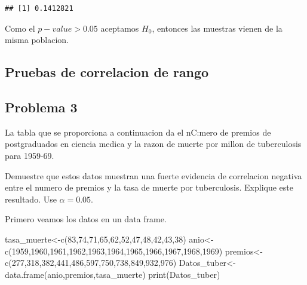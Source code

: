 \documentclass[
]{article}
\newenvironment{Shaded}{\begin{snugshade}}{\end{snugshade}}
\newcommand{\DecValTok}[1]{\textcolor[rgb]{0.00,0.00,0.81}{#1}}
\newcommand{\FunctionTok}[1]{\textcolor[rgb]{0.00,0.00,0.00}{#1}}
\newcommand{\NormalTok}[1]{#1}
\newcommand{\OtherTok}[1]{\textcolor[rgb]{0.56,0.35,0.01}{#1}}
\begin{document}
\begin{verbatim}
## [1] 0.1412821
\end{verbatim}

Como el \(p-value>0.05\) aceptamos \(H_{0}\), entonces las muestras
vienen de la misma poblacion.

\hypertarget{pruebas-de-correlacion-de-rango}{%
\subsection{Pruebas de correlacion de
rango}\label{pruebas-de-correlacion-de-rango}}

\hypertarget{problema-3-1}{%
\subsection{Problema 3}\label{problema-3-1}}

La tabla que se proporciona a continuacion da el nC:mero de premios de
postgraduados en ciencia medica y la razon de muerte por millon de
tuberculosis para 1959-69.

Demuestre que estos datos muestran una fuerte evidencia de correlacion
negativa entre el numero de premios y la tasa de muerte por
tuberculosis. Explique este resultado. Use \(\alpha=0.05\).

Primero veamos los datos en un data frame.

\begin{Shaded}
\begin{Highlighting}[]
\NormalTok{tasa\_muerte}\OtherTok{\textless{}{-}}\FunctionTok{c}\NormalTok{(}\DecValTok{83}\NormalTok{,}\DecValTok{74}\NormalTok{,}\DecValTok{71}\NormalTok{,}\DecValTok{65}\NormalTok{,}\DecValTok{62}\NormalTok{,}\DecValTok{52}\NormalTok{,}\DecValTok{47}\NormalTok{,}\DecValTok{48}\NormalTok{,}\DecValTok{42}\NormalTok{,}\DecValTok{43}\NormalTok{,}\DecValTok{38}\NormalTok{)}
\NormalTok{anio}\OtherTok{\textless{}{-}}\FunctionTok{c}\NormalTok{(}\DecValTok{1959}\NormalTok{,}\DecValTok{1960}\NormalTok{,}\DecValTok{1961}\NormalTok{,}\DecValTok{1962}\NormalTok{,}\DecValTok{1963}\NormalTok{,}\DecValTok{1964}\NormalTok{,}\DecValTok{1965}\NormalTok{,}\DecValTok{1966}\NormalTok{,}\DecValTok{1967}\NormalTok{,}\DecValTok{1968}\NormalTok{,}\DecValTok{1969}\NormalTok{) }
\NormalTok{premios}\OtherTok{\textless{}{-}}\FunctionTok{c}\NormalTok{(}\DecValTok{277}\NormalTok{,}\DecValTok{318}\NormalTok{,}\DecValTok{382}\NormalTok{,}\DecValTok{441}\NormalTok{,}\DecValTok{486}\NormalTok{,}\DecValTok{597}\NormalTok{,}\DecValTok{750}\NormalTok{,}\DecValTok{738}\NormalTok{,}\DecValTok{849}\NormalTok{,}\DecValTok{932}\NormalTok{,}\DecValTok{976}\NormalTok{)}
\NormalTok{Datos\_tuber}\OtherTok{\textless{}{-}}\FunctionTok{data.frame}\NormalTok{(anio,premios,tasa\_muerte)}
\FunctionTok{print}\NormalTok{(Datos\_tuber)}
\end{Highlighting}
\end{Shaded}
\end{document}
